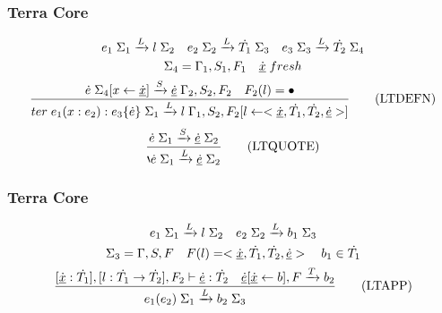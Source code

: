 \documentclass{beamer}
\begin{document}
\begin{frame}
  \frametitle{Terra Core}
  \begin{gather*}
    e_1 \thickspace \Sigma_1 \xrightarrow[]{L} l \thickspace \Sigma_2 \quad e_2 \thickspace \Sigma_2 \xrightarrow[]{L} \dot{T_1} \thickspace \Sigma_3 \quad e_3 \thickspace \Sigma_3 \xrightarrow[]{L} \dot{T_2} \thickspace \Sigma_4 \\
    \Sigma_4 = \Gamma_1, S_1, F_1 \quad \underline{\dot{x}} \thickspace fresh \\
    \frac{\dot{e} \thickspace \Sigma_4[x \leftarrow \underline{\dot{x}}] \xrightarrow[]{S} \underline{\dot{e}} \thickspace \Gamma_2, S_2, F_2 \quad F_2(l) = \bullet}{ter \thickspace e_1(x: e_2): e_3\{\dot{e}\} \thickspace \Sigma_1 \xrightarrow[]{L} l \thickspace \Gamma_1, S_2, F_2[l \leftarrow <\underline{\dot{x}}, \dot{T_1}, \dot{T_2}, \underline{\dot{e}}>]}\tag{LTDEFN}
  \end{gather*}
  \newline
  \begin{equation}
    \frac{\dot{e} \thickspace \Sigma_1 \xrightarrow[]{S} \underline{\dot{e}} \thickspace \Sigma_2}{\backprime{\dot{e}} \thickspace \Sigma_1 \xrightarrow[]{L} \underline{\dot{e}} \thickspace \Sigma_2}\tag{LTQUOTE}
  \end{equation}
\end{frame}

\begin{frame}
  \frametitle{Terra Core}
  \begin{gather*}
    e_1 \thickspace \Sigma_1 \xrightarrow[]{L} l \thickspace \Sigma_2 \quad e_2 \thickspace \Sigma_2 \xrightarrow[]{L} b_1 \thickspace \Sigma_3 \\
    \Sigma_3 = \Gamma, S, F \quad F(l) = <\underline{\dot{x}}, \dot{T_1}, \dot{T_2}, \underline{\dot{e}}> \quad b_1 \in \dot{T_1} \\
    \frac{[\underline{\dot{x}}: \dot{T_1}], [l: \dot{T_1} \rightarrow \dot{T_2}], F_2 \vdash \underline{\dot{e}}: \dot{T_2} \quad \underline{\dot{e}}[\underline{\dot{x}} \leftarrow b], F \xrightarrow[]{T} b_2}{e_1(e_2) \thickspace \Sigma_1 \xrightarrow[]{L} b_2 \thickspace \Sigma_3}\tag{LTAPP}
  \end{gather*}
\end{frame}
\end{document}

